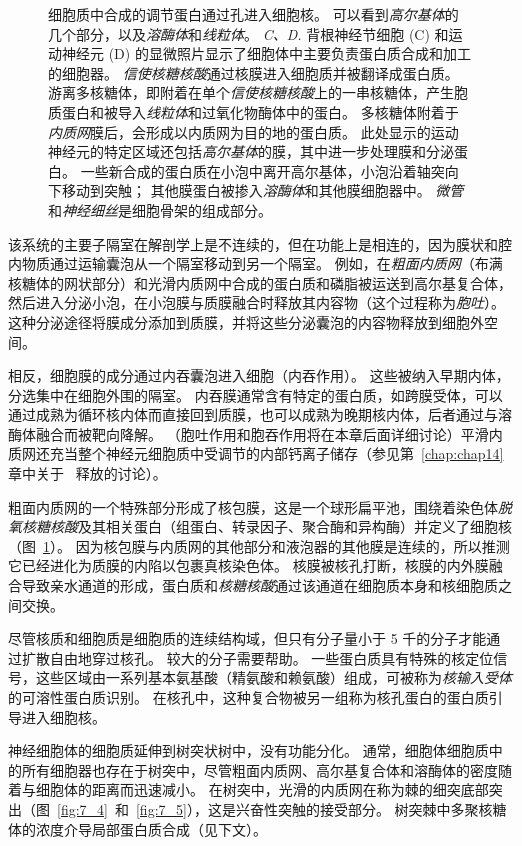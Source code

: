 \begin{figure}[htbp]
{		细胞质中合成的调节蛋白通过孔进入细胞核。
		可以看到\textit{高尔基体}的几个部分，以及\textit{溶酶体}和\textit{线粒体}。
		\textit{C、D.} 背根神经节细胞 (C) 和运动神经元 (D) 的显微照片显示了细胞体中主要负责蛋白质合成和加工的细胞器。
		\textit{信使核糖核酸}通过核膜进入细胞质并被翻译成蛋白质。
		游离多核糖体，即附着在单个\textit{信使核糖核酸}上的一串核糖体，产生胞质蛋白和被导入\textit{线粒体}和过氧化物酶体中的蛋白。
		多核糖体附着于\textit{内质网}膜后，会形成以内质网为目的地的蛋白质。
		此处显示的运动神经元的特定区域还包括\textit{高尔基体}的膜，其中进一步处理膜和分泌蛋白。
		一些新合成的蛋白质在小泡中离开高尔基体，小泡沿着轴突向下移动到突触；
		其他膜蛋白被掺入\textit{溶酶体}和其他膜细胞器中。
		\textit{微管}和\textit{神经细丝}是细胞骨架的组成部分。}
	\label{fig:7_3}
\end{figure}


该系统的主要子隔室在解剖学上是不连续的，但在功能上是相连的，因为膜状和腔内物质通过运输囊泡从一个隔室移动到另一个隔室。
例如，在\textit{粗面内质网}（布满核糖体的网状部分）和光滑内质网中合成的蛋白质和磷脂被运送到高尔基复合体，然后进入分泌小泡，在小泡膜与质膜融合时释放其内容物（这个过程称为\textit{胞吐}）。
这种分泌途径将膜成分添加到质膜，并将这些分泌囊泡的内容物释放到细胞外空间。


相反，细胞膜的成分通过内吞囊泡进入细胞（内吞作用）。
这些被纳入早期内体，分选集中在细胞外围的隔室。
内吞膜通常含有特定的蛋白质，如跨膜受体，可以通过成熟为循环核内体而直接回到质膜，也可以成熟为晚期核内体，后者通过与溶酶体融合而被靶向降解。
（胞吐作用和胞吞作用将在本章后面详细讨论）平滑内质网还充当整个神经元细胞质中受调节的内部钙离子储存（参见第~\ref{chap:chap14} 章中关于~ 释放的讨论）。


粗面内质网的一个特殊部分形成了核包膜，这是一个球形扁平池，围绕着染色体\textit{脱氧核糖核酸}及其相关蛋白（组蛋白、转录因子、聚合酶和异构酶）并定义了细胞核（图~\ref{fig:7_3}）。
因为核包膜与内质网的其他部分和液泡器的其他膜是连续的，所以推测它已经进化为质膜的内陷以包裹真核染色体。
核膜被核孔打断，核膜的内外膜融合导致亲水通道的形成，蛋白质和\textit{核糖核酸}通过该通道在细胞质本身和核细胞质之间交换。


尽管核质和细胞质是细胞质的连续结构域，但只有分子量小于 5 千的分子才能通过扩散自由地穿过核孔。
较大的分子需要帮助。
一些蛋白质具有特殊的核定位信号，这些区域由一系列基本氨基酸（精氨酸和赖氨酸）组成，可被称为\textit{核输入受体}的可溶性蛋白质识别。
在核孔中，这种复合物被另一组称为核孔蛋白的蛋白质引导进入细胞核。


神经细胞体的细胞质延伸到树突状树中，没有功能分化。 
通常，细胞体细胞质中的所有细胞器也存在于树突中，尽管粗面内质网、高尔基复合体和溶酶体的密度随着与细胞体的距离而迅速减小。 
在树突中，光滑的内质网在称为棘的细突底部突出（图~\ref{fig:7_4}~和~\ref{fig:7_5}），这是兴奋性突触的接受部分。
树突棘中多聚核糖体的浓度介导局部蛋白质合成（见下文）。


